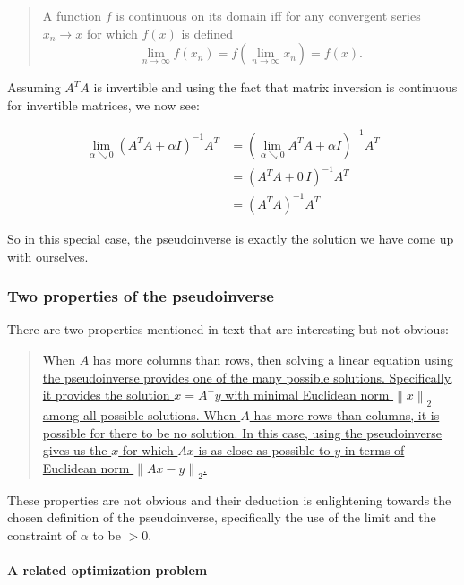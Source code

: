 \documentclass[]{scrartcl}
\let\oldparagraph\paragraph
\renewcommand{\paragraph}[1]{\oldparagraph{#1}\mbox{}}
\begin{document}
\begin{quote}
A function \(f\) is continuous on its domain iff for any convergent
series \(x_n \to x\) for which \(f \left( x \right )\) is defined
\[ \lim_{n \to \infty } f \left ( x_n \right ) = f \left ( \lim_{n \to \infty} x_n \right ) = f \left( x \right).\]
\end{quote}

Assuming \(A^T A\) is invertible and using the fact that matrix
inversion is continuous for invertible matrices, we now see:

\[ \begin{align*} 
\lim _{\alpha \searrow 0}\left( A^{T} A +\alpha I\right) ^{-1} A^T &= \left( \lim _{\alpha \searrow 0} A^{T} A +\alpha I\right) ^{-1} A^T \\
&= \left( A^{T}A+0 \, I\right) ^{-1} A^T \\
&= \left( A^{T}A\right) ^{-1} A^T
\end{align*}  \]

So in this special case, the pseudoinverse is exactly the solution we
have come up with ourselves.

\subsubsection{Two properties of the
pseudoinverse}\label{two-properties-of-the-pseudoinverse}

There are two properties mentioned in text that are interesting but not
obvious:

\begin{quote}
\href{http://www.deeplearningbook.org/contents/linear_algebra.html\#pf10}{When
\(A\) has more columns than rows, then solving a linear equation using
the pseudoinverse provides one of the many possible solutions.
Specifically, it provides the solution \(x=A^+y\) with minimal Euclidean
norm \(\left\| x \right\|_2\) among all possible solutions. When \(A\)
has more rows than columns, it is possible for there to be no solution.
In this case, using the pseudoinverse gives us the \(x\) for which
\(Ax\) is as close as possible to \(y\) in terms of Euclidean norm
\(\left\| Ax - y \right\|_2\).}
\end{quote}

These properties are not obvious and their deduction is enlightening
towards the chosen definition of the pseudoinverse, specifically the use
of the limit and the constraint of \(\alpha\) to be \(>0\).

\paragraph{A related optimization
problem}\label{a-related-optimization-problem}
\end{document}
